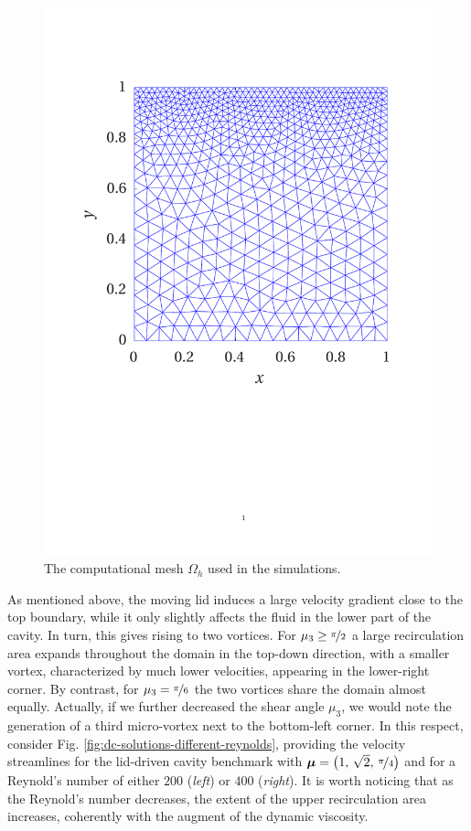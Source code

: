 \documentclass[12pt, a4paper, twoside, openright, notitlepage]{report}
\numberwithin{equation}{chapter}
\theoremstyle{theorem}
\theoremstyle{definition}
\theoremstyle{remark}
\theoremstyle{proposition}
\numberwithin{figure}{chapter}
\newcommand{\bg}[1]{\boldsymbol{#1}}
\begin{document}
		\begin{figure}[H]
			\center
			\includegraphics[scale = 0.375, trim = {2cm 9cm 1.5cm 3.5cm}, clip]{dc_mesh}
			
			\vspace*{-0.2cm}
			
			\caption{The computational mesh $\Omega_h$ used in the simulations.}
			\label{fig:dc-mesh}
		\end{figure}
				
		As mentioned above, the moving lid induces a large velocity gradient close to the top boundary, while it only slightly affects the fluid in the lower part of the cavity. In turn, this gives rising to two vortices. For $\mu_3 \geq \nicefrac{\pi}{2}$ a large recirculation area expands throughout the domain in the top-down direction, with a smaller vortex, characterized by much lower velocities, appearing in the lower-right corner. By contrast, for $\mu_3 = \nicefrac{\pi}{6}$ the two vortices share the domain almost equally. Actually, if we further decreased the shear angle $\mu_3$, we would note the generation of a third micro-vortex next to the bottom-left corner. In this respect, consider Fig. \ref{fig:dc-solutions-different-reynolds}, providing the velocity streamlines for the lid-driven cavity benchmark with $\bg{\mu} = \big( 1, \, \sqrt{2}, \, \nicefrac{\pi}{4} \big)$ and for a Reynold's number of either $200$ (\emph{left}) or $400$ (\emph{right}). It is worth noticing that as the Reynold's number decreases, the extent of the upper recirculation area increases, coherently with the augment of the dynamic viscosity. 
		
\end{document}
